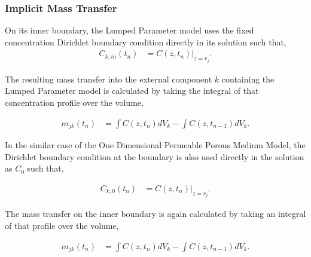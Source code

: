 \subsubsection{Implicit Mass Transfer}

On its inner boundary, the Lumped Parameter model uses the fixed concentration
Dirichlet boundary condition directly in its solution such that,
\begin{align}
C_{k,in}(t_n) &= C(z, t_n)|_{z=r_j}.
\end{align}

The resulting mass transfer into the external component $k$ containing the Lumped
Parameter model is calculated by taking the integral of that concentration
profile over the volume,

\begin{align}
m_{jk}(t_n) &=\int C(z,t_n)dV_k - \int C(z, t_{n-1})dV_k.
\end{align}


In the similar case of the One Dimensional Permeable Porous Medium Model,
the Dirichlet boundary condition at the boundary is also used directly in
the solution as $C_0$ such that,

\begin{align}
  C_{k,0}(t_n) &= C(z, t_n)|_{z=r_j}.
\end{align}

The mass transfer on the inner boundary is again calculated by taking an
integral of that profile over the volume,

\begin{align}
m_{jk}(t_n) &=\int C(z,t_n)dV_k - \int C(z, t_{n-1})dV_k.
\end{align}
